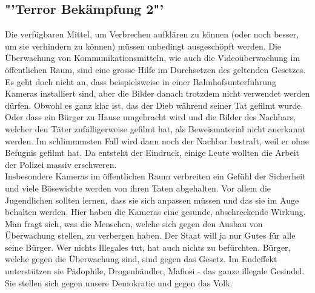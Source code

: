 \subsection{"'Terror Bekämpfung 2"'}
Die verfügbaren Mittel, um Verbrechen 
aufklären zu können (oder noch besser, um sie verhindern zu können) 
müssen unbedingt ausgeschöpft werden. Die Überwachung von 
Kommunikationsmitteln, wie auch die Videoüberwachung im öffentlichen 
Raum, sind eine grosse Hilfe im Durchsetzen des geltenden Gesetzes. Es 
geht doch nicht an, dass beispielsweise in einer 
Bahnhofsunterführung Kameras installiert sind, aber die Bilder danach 
trotzdem nicht verwendet werden dürfen. Obwohl es ganz klar ist, das 
der Dieb während seiner Tat gefilmt wurde. Oder dass ein B\"urger zu Hause 
umgebracht wird und die Bilder des Nachbars, welcher den Täter 
zufälligerweise gefilmt hat, als Beweismaterial nicht anerkannt werden. 
Im schlimmmsten Fall wird dann noch der Nachbar bestraft, weil er ohne 
Befugnis gefilmt hat. Da entsteht der Eindruck, einige Leute wollten 
die Arbeit der Polizei massiv erschweren.\\
Insbesondere Kameras im öffentlichen Raum verbreiten
ein Gefühl der Sicherheit und viele Bösewichte werden von ihren 
Taten abgehalten. Vor allem die Jugendlichen sollten lernen, dass sie 
sich anpassen müssen und das sie im Auge behalten werden. Hier haben die 
Kameras eine gesunde, abschreckende Wirkung.\\
Man fragt sich, was die Menschen, welche sich gegen den Ausbau von 
Überwachung stellen, zu verbergen haben. Der Staat will ja nur Gutes 
für alle seine B\"urger. Wer nichts Illegales tut, hat auch nichts zu befürchten. 
Bürger, welche gegen die Überwachung sind, sind gegen das Gesetz. Im 
Endeffekt unterstützen sie Pädophile, Drogenhändler, Mafiosi - das 
ganze illegale Gesindel. Sie stellen sich gegen unsere Demokratie und 
gegen das Volk.

